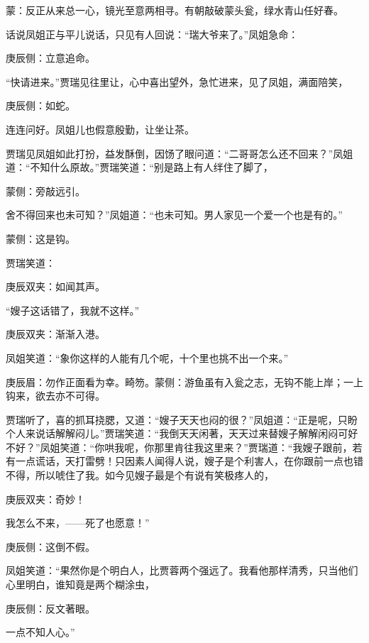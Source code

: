 
\begin{parag}
    \begin{note}蒙：反正从来总一心，镜光至意两相寻。有朝敲破蒙头瓮，绿水青山任好春。\end{note}
\end{parag}


\begin{parag}
    话说凤姐正与平儿说话，只见有人回说：“瑞大爷来了。”凤姐急命：\begin{note}庚辰侧：立意追命。\end{note}“快请进来。”贾瑞见往里让，心中喜出望外，急忙进来，见了凤姐，满面陪笑，\begin{note}庚辰侧：如蛇。\end{note}连连问好。凤姐儿也假意殷勤，让坐让茶。
\end{parag}


\begin{parag}
    贾瑞见凤姐如此打扮，益发酥倒，因饧了眼问道：“二哥哥怎么还不回来？”凤姐道：“不知什么原故。”贾瑞笑道：“别是路上有人绊住了脚了，\begin{note}蒙侧：旁敲远引。\end{note}舍不得回来也未可知？”凤姐道：“也未可知。男人家见一个爱一个也是有的。”\begin{note}蒙侧：这是钩。\end{note}贾瑞笑道：\begin{note}庚辰双夹：如闻其声。\end{note}“嫂子这话错了，我就不这样。”\begin{note}庚辰双夹：渐渐入港。\end{note}凤姐笑道：“象你这样的人能有几个呢，十个里也挑不出一个来。”\begin{note}庚辰眉：勿作正面看为幸。畸笏。蒙侧：游鱼虽有入瓮之志，无钩不能上岸；一上钩来，欲去亦不可得。\end{note}贾瑞听了，喜的抓耳挠腮，又道：“嫂子天天也闷的很？”凤姐道：“正是呢，只盼个人来说话解解闷儿。”贾瑞笑道：“我倒天天闲著，天天过来替嫂子解解闲闷可好不好？”凤姐笑道：“你哄我呢，你那里肯往我这里来？”贾瑞道：“我嫂子跟前，若有一点谎话，天打雷劈！只因素人闻得人说，嫂子是个利害人，在你跟前一点也错不得，所以唬住了我。如今见嫂子最是个有说有笑极疼人的，\begin{note}庚辰双夹：奇妙！\end{note}我怎么不来，——死了也愿意！”\begin{note}庚辰侧：这倒不假。\end{note}凤姐笑道：“果然你是个明白人，比贾蓉两个强远了。我看他那样清秀，只当他们心里明白，谁知竟是两个糊涂虫，\begin{note}庚辰侧：反文著眼。\end{note}一点不知人心。”
\end{parag}



